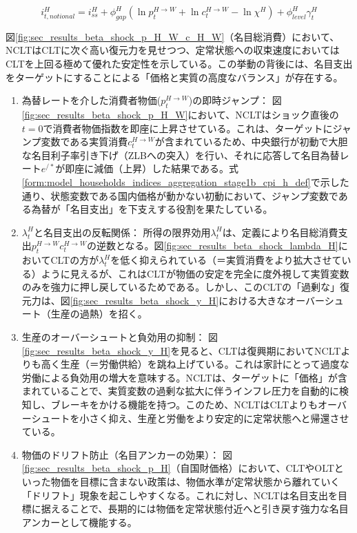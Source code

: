 \begin{equation}
i_{t,notional}^H=i_{ss}^H+\phi_{gap}^H(\ln p_t^{H\to W}+\ln c_t^{H\to W}-\ln\chi^H)+\phi_{level}^H\gamma_t^H
\label{form:sec_results_beta_shock_analysis_nclt_policy}
\end{equation}

図\ref{fig:sec_results_beta_shock_p_H_W_c_H_W}（名目総消費）において、NCLTはCLTに次ぐ高い復元力を見せつつ、定常状態への収束速度においてはCLTを上回る極めて優れた安定性を示している。この挙動の背後には、名目支出をターゲットにすることによる「価格と実質の高度なバランス」が存在する。

\begin{enumerate}
    \item\label{itm:sec_results_beta_shock_analysis_nclt_cpi} 為替レートを介した消費者物価(\(p_t^{H\to W}\))の即時ジャンプ：
    図\ref{fig:sec_results_beta_shock_p_H_W}において、NCLTはショック直後の\(t=0\)で消費者物価指数を即座に上昇させている。これは、ターゲットにジャンプ変数である実質消費\(c_t^{H\to W}\)が含まれているため、中央銀行が初動で大胆な名目利子率引き下げ（ZLBへの突入）を行い、それに応答して名目為替レート\(e^{/*}\)が即座に減価（上昇）した結果である。式\eqref{form:model_households_indices_aggregation_stage1b_cpi_h_def}で示した通り、状態変数である国内価格が動かない初動において、ジャンプ変数である為替が「名目支出」を下支えする役割を果たしている。
    \item\label{itm:sec_results_beta_shock_analysis_nclt_lambda} \(\lambda_t^H\)と名目支出の反転関係：
    所得の限界効用\(\lambda_t^H\)は、定義により名目総消費支出\(p_t^{H\to W}c_t^{H\to W}\)の逆数となる。図\ref{fig:sec_results_beta_shock_lambda_H}においてCLTの方が\(\lambda_t^H\)を低く抑えられている（＝実質消費をより拡大させている）ように見えるが、これはCLTが物価の安定を完全に度外視して実質変数のみを強力に押し戻しているためである。しかし、このCLTの「過剰な」復元力は、図\ref{fig:sec_results_beta_shock_y_H}における大きなオーバーシュート（生産の過熱）を招く。
    \item\label{itm:sec_results_beta_shock_analysis_nclt_overshoot} 生産のオーバーシュートと負効用の抑制：
    図\ref{fig:sec_results_beta_shock_y_H}を見ると、CLTは復興期においてNCLTよりも高く生産（＝労働供給）を跳ね上げている。これは家計にとって過度な労働による負効用の増大を意味する。NCLTは、ターゲットに「価格」が含まれていることで、実質変数の過剰な拡大に伴うインフレ圧力を自動的に検知し、ブレーキをかける機能を持つ。このため、NCLTはCLTよりもオーバーシュートを小さく抑え、生産と労働をより安定的に定常状態へと帰還させている。
    \item\label{itm:sec_results_beta_shock_analysis_nclt_anchor} 物価のドリフト防止（名目アンカーの効果）：
    図\ref{fig:sec_results_beta_shock_p_H}（自国財価格）において、CLTやOLTといった物価を目標に含まない政策は、物価水準が定常状態から離れていく「ドリフト」現象を起こしやすくなる。これに対し、NCLTは名目支出を目標に据えることで、長期的には物価を定常状態付近へと引き戻す強力な名目アンカーとして機能する。
\end{enumerate}

